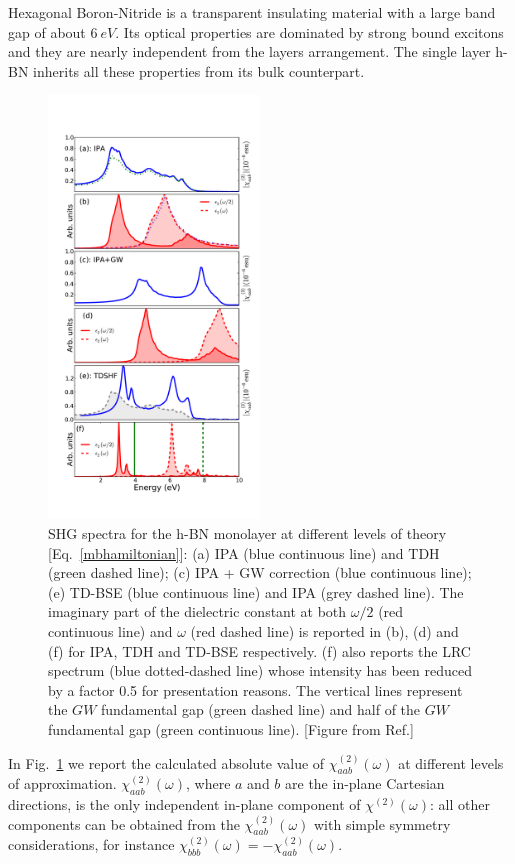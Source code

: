 Hexagonal Boron-Nitride is a transparent insulating material with a large band gap of about $6~eV$. Its optical properties are dominated by strong bound excitons and they are nearly independent from the layers arrangement.\cite{PhysRevLett.96.126104,PhysRevLett.100.189701} The single layer h-BN inherits all these properties from its bulk counterpart.
\begin{figure}[H]
    \centering
\includegraphics[width=0.5\textwidth]{Figures/eps_and_X2}
\caption{\footnotesize{SHG spectra for the h-BN monolayer at different levels of theory [Eq.~\eqref{mbhamiltonian}]: (a) IPA (blue continuous line) and TDH (green dashed line); (c) IPA + GW correction (blue continuous line); (e) TD-BSE (blue continuous line) and IPA (grey dashed line). The imaginary part of the dielectric constant at both $\omega/2$ (red continuous line) and $\omega$ (red dashed line) is reported in (b), (d) and (f) for IPA, TDH and TD-BSE respectively. (f) also reports the LRC spectrum (blue dotted-dashed line) whose intensity has been reduced by a factor 0.5 for presentation reasons. The vertical lines represent the $GW$ fundamental gap (green dashed line) and half of the $GW$ fundamental gap (green continuous line). \label{absX2bn} [Figure from Ref.\cite{PhysRevB.89.081102}]}}
\end{figure}
In Fig.~\ref{absX2bn} we report the calculated absolute value of $\chi^{(2)}_{aab} (\omega)$ at different levels of approximation. $\chi^{(2)}_{aab} (\omega)$, where $a$ and $b$ are the in-plane Cartesian directions, is the only independent in-plane component of $\chi^{(2)} (\omega)$: all other components can be obtained from the $\chi^{(2)}_{aab} (\omega)$ with simple symmetry considerations, for instance $\chi^{(2)}_{bbb} (\omega)=-\chi^{(2)}_{aab} (\omega)$. 
